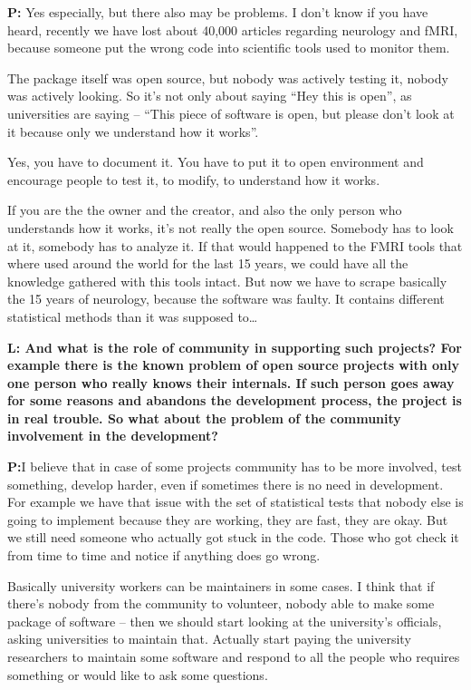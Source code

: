 \documentclass[10pt, a5paper]{article}
\begin{document}
\begin{Parallel}[p]{}{}
{{\noindent \bf P:} Yes especially, but there also may be problems. I don't know if you have heard, recently we have lost about 40,000 articles regarding neurology and fMRI, because someone put the wrong code into scientific tools used to monitor them. 

The package itself was open source, but nobody was actively testing it, nobody was actively looking. So it's not only about saying “Hey this is open”, as universities are saying -- “This piece of software is open, but please don't look at it because only we understand how it works”. 

Yes, you have to document it. You have to put it to open environment and encourage people to test it, to modify, to understand how it works.

If you are the the owner and the creator, and also the only person who understands how it works, it's not really the open source. Somebody has to look at it, somebody has to analyze it. If that would happened to the FMRI tools that where used around the world for the last 15 years, we could have all the knowledge gathered with this tools intact. But now we have to scrape basically the 15 years of neurology, because the software was faulty. It contains different statistical methods than it was supposed to\ldots

{\noindent \bf L: And what is the role of community in supporting such projects? For example there is the known problem of open source projects with only one person who really knows their internals. If such person goes away for some reasons and abandons the development process, the project is in real trouble. So what about the problem of the community involvement in the development?}

{\noindent \bf P:}I believe that in case of some projects community has to be more involved, test something, develop harder, even if sometimes there is no need in development. For example we have that issue with the set of statistical tests that nobody else is going to implement because they are working, they are fast, they are okay. But we still need someone who actually got stuck in the code. Those who got check it from time to time and notice if anything does go wrong. 

Basically university workers can be maintainers in some cases. I think that if there's nobody from the community to volunteer, nobody able to make some package of software -- then we should start looking at the university's officials, asking universities to maintain that. Actually start paying the university researchers to maintain some software and respond to all the people who requires something or would like to ask some questions. 

}
\end{Parallel}
\end{document}
